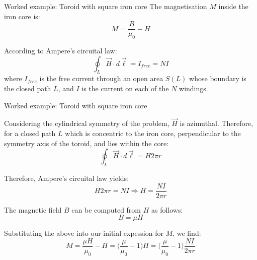 {\begin{frame}{Worked example: Toroid with square iron core}
  The magnetisation $M$ inside the iron core is:
  \begin{equation*}
    M = \frac{B}{\mu_0} - H
  \end{equation*}

  According to Ampere's circuital law:
  \begin{equation*}
    \oint_{L} \vec{H} \cdot d\vec{\ell} = I_{free} = N I
  \end{equation*}
  where $I_{free}$ is the free current through an open area $S(L)$
  whose boundary is the closed path $L$, and $I$ is the current on
  each of the $N$ windings.

\end{frame}

%
%
%

\begin{frame}{Worked example: Toroid with square iron core}

  Considering the cylindrical symmetry of the problem, $\vec{H}$ is azimuthal.
  Therefore, for a closed path $L$ which is concentric to the iron core,
  perpendicular to the symmetry axis of the toroid,
  and lies within the core:
  \begin{equation*}
    \oint_{L} \vec{H} \cdot d\vec{\ell} = H 2\pi r
  \end{equation*}

  Therefore, Ampere's circuital law yields:
  \begin{equation*}
    H 2\pi r = N I \Rightarrow H = \frac{NI}{2\pi r}
  \end{equation*}

  The magnetic field $B$ can be computed from $H$ as follows:
  \begin{equation*}
     B = \mu H
  \end{equation*}

  Substituting the above into our initial expession for $M$, we find:
  \begin{equation*}
    M = \frac{\mu H}{\mu_0} - H
      = \Big( \frac{\mu}{\mu_0} - 1 \Big) H
      = \Big( \frac{\mu}{\mu_0} - 1 \Big) \frac{NI}{2\pi r}
  \end{equation*}

\end{frame}

} %
